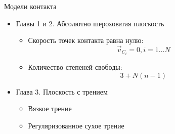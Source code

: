 \begin{frame}{Модели контакта}
    \begin{itemize}
        \item {
            Главы 1 и 2. Абсолютно шероховатая плоскость
            \begin{itemize}
                \item {
                    Скорость точек контакта равна нулю:
                    $$\vec{v}_{C_i} = 0, i = 1\dots N$$
                }
                \item {
                    Количество степеней свободы:
                    $$3 + N(n-1)$$
                }
            \end{itemize}
        }
        \item {
            Глава 3. Плоскость с трением
            \begin{itemize}
                \item {
                    Вязкое трение
                }
                \item {
                    Регуляризованное сухое трение
                }
            \end{itemize}
        }
    \end{itemize}
\end{frame}